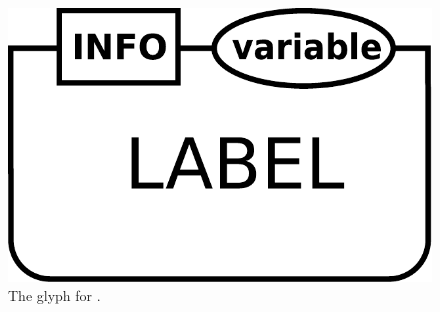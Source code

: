 \begin{figure}[H]
  \centering
  \includegraphics[scale = 0.3]{images/genetic}
  \caption{The \PD glyph for .}
  \label{fig:genetic}
\end{figure}

\normalcolor

